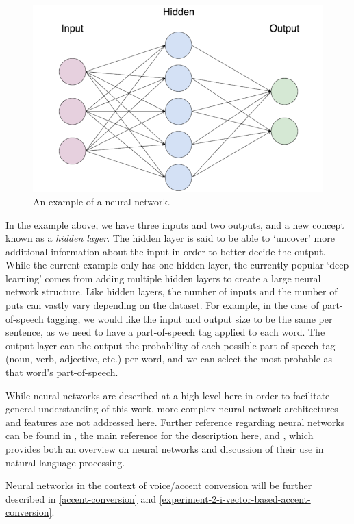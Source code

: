 \documentclass
[
    a4paper,
    twoside,
    12pt,
]
{report}
\begin{document}
\begin{figure}[H]
\centering
\includegraphics[scale=0.35]{img/neural-network.png}
\caption{An example of a neural network.}
\label{fig:neural-network}
\end{figure}

In the example above, we have three inputs and two outputs, and a new
concept known as a \emph{hidden layer}. The hidden layer is said to be
able to `uncover' more additional information about the input in order
to better decide the output. While the current example only has one
hidden layer, the currently popular `deep learning' comes from adding
multiple hidden layers to create a large neural network structure. Like
hidden layers, the number of inputs and the number of puts can vastly
vary depending on the dataset. For example, in the case of
part-of-speech tagging, we would like the input and output size to be
the same per sentence, as we need to have a part-of-speech tag applied
to each word. The output layer can the output the probability of each
possible part-of-speech tag (noun, verb, adjective, etc.) per word, and
we can select the most probable as that word's part-of-speech.

While neural networks are described at a high level here in order to
facilitate general understanding of this work, more complex neural
network architectures and features are not addressed here. Further
reference regarding neural networks can be found in
\textcite{nielsen2015}, the main reference for the description here, and
\textcite{goldberg2017}, which provides both an overview on neural
networks and discussion of their use in natural language processing.

Neural networks in the context of voice/accent conversion will be
further described in \autoref{accent-conversion} and
\autoref{experiment-2-i-vector-based-accent-conversion}.
\end{document}
